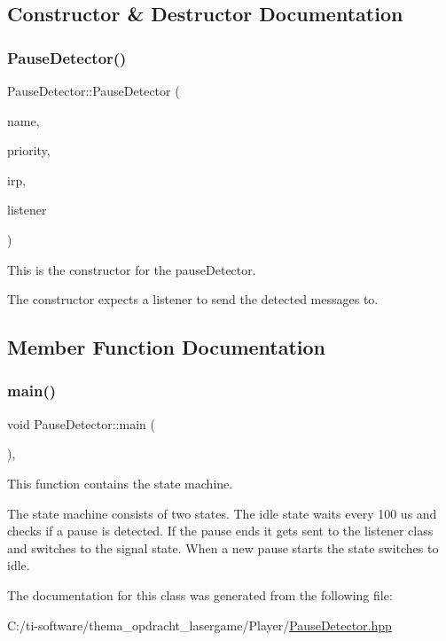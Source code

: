 \subsection{Constructor \& Destructor Documentation}
\mbox{\label{class_pause_detector_a89abb61f172dcdcdda2ab5ce3792983f}} 
\subsubsection{\texorpdfstring{Pause\+Detector()}{PauseDetector()}}
{\footnotesize\ttfamily Pause\+Detector\+::\+Pause\+Detector (\begin{DoxyParamCaption}\item[{const char $\ast$}]{name,  }\item[{int}]{priority,  }\item[{hwlib\+::pin\+\_\+in \&}]{irp,  }\item[{\mbox{\hyperlink{class_pause_listener}{Pause\+Listener}} \&}]{listener }\end{DoxyParamCaption})\hspace{0.3cm}{\ttfamily [inline]}}



This is the constructor for the pause\+Detector. 

The constructor expects a listener to send the detected messages to. 

\subsection{Member Function Documentation}
\mbox{\label{class_pause_detector_a0ee4661673d1e5604877903c5d2cb35e}} 
\subsubsection{\texorpdfstring{main()}{main()}}
{\footnotesize\ttfamily void Pause\+Detector\+::main (\begin{DoxyParamCaption}{ }\end{DoxyParamCaption})\hspace{0.3cm}{\ttfamily [inline]}, {\ttfamily [override]}}



This function contains the state machine. 

The state machine consists of two states. The idle state waits every 100 us and checks if a pause is detected. If the pause ends it gets sent to the listener class and switches to the signal state. When a new pause starts the state switches to idle. 

The documentation for this class was generated from the following file\+:\begin{DoxyCompactItemize}
\item 
C\+:/ti-\/software/thema\+\_\+opdracht\+\_\+lasergame/\+Player/\mbox{\hyperlink{_pause_detector_8hpp}{Pause\+Detector.\+hpp}}\end{DoxyCompactItemize}
